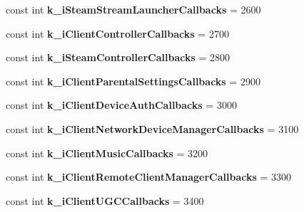 \begin{DoxyCompactItemize}
const int {\bfseries k\+\_\+i\+Steam\+Stream\+Launcher\+Callbacks} = 2600
\item 
\mbox{\label{class_valve_1_1_steamworks_1_1_steam_a_p_i_aaed26089f7b33cc364eb3460dbf32e37}} 
const int {\bfseries k\+\_\+i\+Client\+Controller\+Callbacks} = 2700
\item 
\mbox{\label{class_valve_1_1_steamworks_1_1_steam_a_p_i_ae9b9d195780942de864a33ea87431d86}} 
const int {\bfseries k\+\_\+i\+Steam\+Controller\+Callbacks} = 2800
\item 
\mbox{\label{class_valve_1_1_steamworks_1_1_steam_a_p_i_a0af6c0f1e8efa68dced772c1175658c2}} 
const int {\bfseries k\+\_\+i\+Client\+Parental\+Settings\+Callbacks} = 2900
\item 
\mbox{\label{class_valve_1_1_steamworks_1_1_steam_a_p_i_ad95613a8d8fed0fb2c1b39d5a0a42f75}} 
const int {\bfseries k\+\_\+i\+Client\+Device\+Auth\+Callbacks} = 3000
\item 
\mbox{\label{class_valve_1_1_steamworks_1_1_steam_a_p_i_a0d44831ed86f346a4821026a42534ad1}} 
const int {\bfseries k\+\_\+i\+Client\+Network\+Device\+Manager\+Callbacks} = 3100
\item 
\mbox{\label{class_valve_1_1_steamworks_1_1_steam_a_p_i_a5f1d7c2211490396371260a2788b5979}} 
const int {\bfseries k\+\_\+i\+Client\+Music\+Callbacks} = 3200
\item 
\mbox{\label{class_valve_1_1_steamworks_1_1_steam_a_p_i_a0cb60f506bcd385c5a83c720880818d6}} 
const int {\bfseries k\+\_\+i\+Client\+Remote\+Client\+Manager\+Callbacks} = 3300
\item 
\mbox{\label{class_valve_1_1_steamworks_1_1_steam_a_p_i_a8dc6c627c8da6479a4809ef5c510faa6}} 
const int {\bfseries k\+\_\+i\+Client\+U\+G\+C\+Callbacks} = 3400
\item 
\mbox{\label{class_valve_1_1_steamworks_1_1_steam_a_p_i_ad64840c68b35faf675c4139fa87ffb4a}} 

\end{DoxyCompactItemize}

